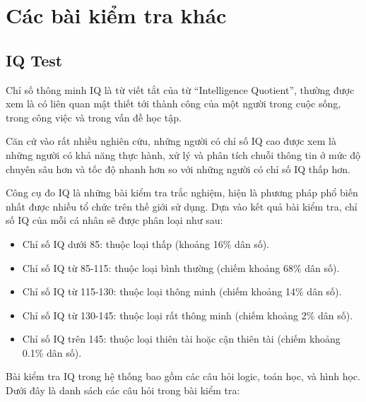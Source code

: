 \section{Các bài kiểm tra khác}

\subsection{IQ Test}
Chỉ số thông minh IQ là từ viết tắt của từ ``Intelligence Quotient'', thường được xem là có liên quan mật thiết tới thành công của một người trong cuộc sống, trong công việc và trong vấn đề học tập. 

Căn cứ vào rất nhiều nghiên cứu, những người có chỉ số IQ cao được xem là những người có khả năng thực hành, xử lý và phân tích chuỗi thông tin ở mức độ chuyên sâu hơn và tốc độ nhanh hơn so với những người có chỉ số IQ thấp hơn. 

Công cụ đo IQ là những bài kiểm tra trắc nghiệm, hiện là phương pháp phổ biến nhất được nhiều tổ chức trên thế giới sử dụng. Dựa vào kết quả bài kiểm tra, chỉ số IQ của mỗi cá nhân sẽ được phân loại như sau:
\begin{itemize}
    \item Chỉ số IQ dưới 85: thuộc loại thấp (khoảng 16\% dân số).
    \item Chỉ số IQ từ 85-115: thuộc loại bình thường (chiếm khoảng 68\% dân số).
    \item Chỉ số IQ từ 115-130: thuộc loại thông minh (chiếm khoảng 14\% dân số).
    \item Chỉ số IQ từ 130-145: thuộc loại rất thông minh (chiếm khoảng 2\% dân số).
    \item Chỉ số IQ trên 145: thuộc loại thiên tài hoặc cận thiên tài (chiếm khoảng 0.1\% dân số).
\end{itemize}

Bài kiểm tra IQ trong hệ thống bao gồm các câu hỏi logic, toán học, và hình học. Dưới đây là danh sách các câu hỏi trong bài kiểm tra:

